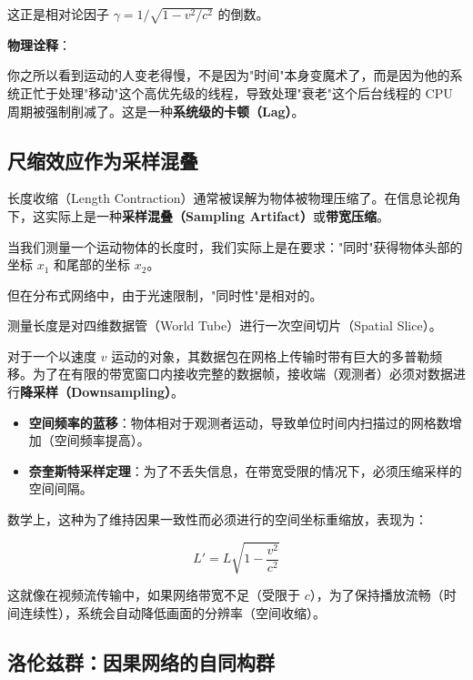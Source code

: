 这正是相对论因子 $\gamma = 1/\sqrt{1 - v^2/c^2}$ 的倒数。

\textbf{物理诠释}：

你之所以看到运动的人变老得慢，不是因为"时间"本身变魔术了，而是因为他的系统正忙于处理"移动"这个高优先级的线程，导致处理"衰老"这个后台线程的 CPU 周期被强制削减了。这是一种\textbf{系统级的卡顿（Lag）}。

\subsection{尺缩效应作为采样混叠}

长度收缩（Length Contraction）通常被误解为物体被物理压缩了。在信息论视角下，这实际上是一种\textbf{采样混叠（Sampling Artifact）}或\textbf{带宽压缩}。

当我们测量一个运动物体的长度时，我们实际上是在要求："同时"获得物体头部的坐标 $x_1$ 和尾部的坐标 $x_2$。

但在分布式网络中，由于光速限制，"同时性"是相对的。

\begin{definition}[测量作为切片]
测量长度是对四维数据管（World Tube）进行一次空间切片（Spatial Slice）。
\end{definition}

对于一个以速度 $v$ 运动的对象，其数据包在网格上传输时带有巨大的多普勒频移。为了在有限的带宽窗口内接收完整的数据帧，接收端（观测者）必须对数据进行\textbf{降采样（Downsampling）}。

\begin{itemize}
\item \textbf{空间频率的蓝移}：物体相对于观测者运动，导致单位时间内扫描过的网格数增加（空间频率提高）。

\item \textbf{奈奎斯特采样定理}：为了不丢失信息，在带宽受限的情况下，必须压缩采样的空间间隔。
\end{itemize}

数学上，这种为了维持因果一致性而必须进行的空间坐标重缩放，表现为：

\begin{equation}
L' = L \sqrt{1 - \frac{v^2}{c^2}}
\end{equation}

这就像在视频流传输中，如果网络带宽不足（受限于 $c$），为了保持播放流畅（时间连续性），系统会自动降低画面的分辨率（空间收缩）。

\subsection{洛伦兹群：因果网络的自同构群}

